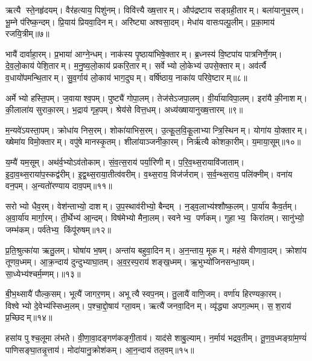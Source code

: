 ऋत्यै स्ते॒नहृ॑दयम्। वैर॑हत्याय॒ पिशु॑नम्। विवि॑त्त्यै ख्ष॒त्तारम्। औप॑द्रष्टाय सङ्ग्रही॒तारम्। बला॑यानुच॒रम्। भू॒म्ने प॑रिष्क॒न्दम्। प्रि॒याय॑ प्रियवा॒दिनम्। अरि॑ष्ट्या अश्वसा॒दम्। मेधा॑य वासःपल्पू॒लीम्। प्र॒का॒माय॑ रजयि॒त्रीम्॥७॥

भायै॑ दार्वाहा॒रम्। प्र॒भाया॑ आग्ने॒न्धम्। नाक॑स्य पृ॒ष्ठाया॑भिषे॒क्तारम्। ब्र॒ध्नस्य॑ वि॒ष्टपा॑य पात्रनिर्णे॒गम्। दे॒व॒लो॒काय॑ पेशि॒तारम्। म॒नु॒ष्य॒लो॒काय॑ प्रकरि॒तारम्। सर्वेभ्यो लो॒केभ्य॑ उपसे॒क्तारम्। अव॑र्त्यै व॒धायो॑पमन्थि॒तारम्। सु॒व॒र्गाय॑ लो॒काय॑ भाग॒दुघम्। वर्\mbox{}षि॑ष्ठाय॒ नाका॑य परिवे॒ष्टारम्॥८॥

अर्मेभ्यो हस्ति॒पम्। ज॒वायाश्व॒पम्। पुष्ट्यै॑ गोपा॒लम्। तेज॑सेऽजपा॒लम्। वी॒र्या॑याविपा॒लम्। इरा॑यै की॒नाशम्। की॒लाला॑य सुराका॒रम्। भ॒द्राय॑ गृह॒पम्। श्रेय॑से वित्त॒धम्। अध्य॑ख्षायानुख्ष॒त्तारम्॥९॥

म॒न्यवे॑ऽयस्ता॒पम्। क्रोधा॑य निस॒रम्। शोका॑याभिस॒रम्। उ॒त्कू॒ल॒वि॒कू॒लाभ्यान्त्रि॒स्थिनम्। योगा॑य यो॒क्तारम्। ख्षेमा॑य विमो॒क्तारम्। वपु॑षे मानस्कृ॒तम्। शीला॑याञ्जनीका॒रम्। निर्\mbox{}ऋ॑त्यै कोशका॒रीम्। य॒माया॒सूम्॥१०॥

य॒म्यै॑ यम॒सूम्। अथ॑र्व॒भ्योऽव॑तोकाम्। सं॒व॒त्स॒राय॑ पर्या॒रिणीम्। प॒रि॒व॒थ्स॒रायावि॑जाताम्। इ॒दा॒व॒थ्स॒राया॑प॒स्कद्व॑रीम्। इ॒द्व॒थ्स॒राया॒तीत्व॑वरीम्। व॒थ्स॒राय॒ विज॑र्जराम्। स॒र्व॒न्थ्स॒राय॒ पलि॑क्नीम्। वना॑य वन॒पम्। अ॒न्यतो॑रण्याय दाव॒पम्॥११॥

सरोभ्यो धैव॒रम्। वेश॑न्ताभ्यो॒ दाशम्। उ॒प॒स्थाव॑रीभ्यो॒ बैन्दम्। न॒ड्व॒लाभ्य॑श्शौष्क॒लम्। पा॒र्या॑य कैव॒र्तम्। अ॒वा॒र्या॑य मार्गा॒रम्। ती॒र्थेभ्य॑ आ॒न्दम्। विष॑मेभ्यो मैना॒लम्। स्वनेभ्य॒ पर्ण॑कम्। गुहाभ्य॒ किरा॑तम्। सानु॑भ्यो॒ जम्भ॑कम्। पर्व॑तेभ्य॒ किंपू॑रुषम्॥१२॥

प्र॒ति॒श्रुत्का॑या ऋतु॒लम्। घोषा॑य भ॒षम्। अन्ता॑य बहुवा॒दिनम्। अ॒न॒न्ताय॒ मूकम्। मह॑से वीणावा॒दम्। क्रोशा॑य तूणव॒ध्मम्। आ॒क्र॒न्दाय॑ दुन्दुभ्याघा॒तम्। अ॒व॒र॒स्प॒राय॑ शङ्ख॒ध्मम्। ऋ॒भुभ्यो॑जिनसन्धा॒यम्। सा॒ध्येभ्य॑श्चर्म॒म्णम्।॥१३॥

बी॒भ॒थ्सायै॑ पौल्क॒सम्। भूत्यै॑ जागर॒णम्। अभूत्यै स्वप॒नम्। तु॒लायै॑ वाणि॒जम्। वर्णा॑य हिरण्यका॒रम्। विश्वेभ्यो दे॒वेभ्य॑स्सिध्म॒लम्। प॒श्चा॒द्दो॒षाय॑ ग्ला॒वम्। ऋत्यै॑ जनवा॒दिनम्। व्यृ॑द्ध्या अपग॒ल्भम्। स॒श॒राय॑ प्र॒च्छिदम्॥१४॥

हसा॑य पुश्च॒लूमा ल॑भते। वी॒णा॒वा॒दङ्गण॑कङ्गी॒ताय॑। याद॑से शाबु॒ल्याम्। न॒र्माय॑ भद्रव॒तीम्। तू॒ण॒व॒ध्मङ्ग्रा॑म॒ण्यं॑ पाणिसङ्घा॒तन्नृ॒त्ताय॑। मोदा॑यानु॒क्रोश॑कम्। आ॒न॒न्दाय॑ तल॒वम्॥१५॥

